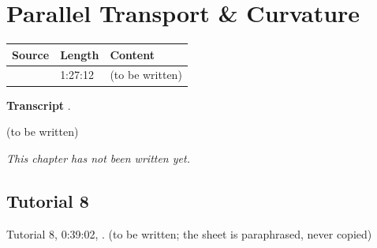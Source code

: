 \chapter{Parallel Transport \& Curvature}\label{ch:c08}
\begin{paracol}{2}

\begin{sources}
\begin{tabularx}{\linewidth}{@{}l l L@{}}
\toprule
\textbf{Source} & \textbf{Length} & \textbf{Content}\\
\midrule
{} & 1:27:12 & (to be written)\\
\bottomrule
\end{tabularx}

\smallskip
\textbf{Transcript} .
\end{sources}

\begin{reading}
(to be written)
\end{reading}

\emph{This chapter has not been written yet.}

\section{Tutorial 8}\label{sec:t08-1}
Tutorial 8, 0:39:02, . (to be written; the sheet is paraphrased, never copied)

\flushside
\end{paracol}
